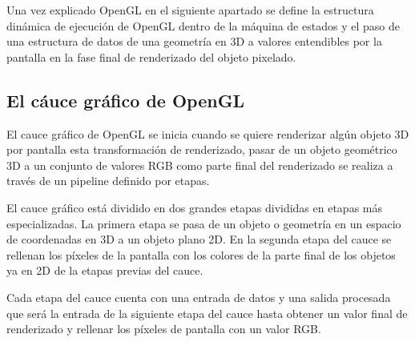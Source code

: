 \documentclass[a4paper, 17pt]{book}
\begin{document}
Una vez explicado OpenGL en el siguiente apartado se define la estructura dinámica de ejecución de OpenGL dentro de la máquina
de estados y el paso de una estructura de datos de una geometría en 3D a valores entendibles por la pantalla en la fase final
de renderizado del objeto pixelado.

\subsection{El cáuce gráfico de OpenGL} 
\label{subsec:CauceOpenGL}

El cauce gráfico de OpenGL se inicia cuando se quiere renderizar algún objeto 3D por pantalla esta transformación de renderizado,
pasar de un objeto geométrico 3D a un conjunto de valores RGB como parte final del renderizado se realiza a través de un pipeline
definido por etapas.

\vspace{1mm} %

El cauce gráfico está dividido en dos grandes etapas divididas en etapas más especializadas. La primera etapa se pasa de un objeto
o geometría en un espacio de coordenadas en 3D a un objeto plano 2D. En la segunda etapa del cauce se rellenan los píxeles de la
pantalla con los colores de la parte final de los objetos ya en 2D de la etapas previas del cauce.

\vspace{1mm} %

Cada etapa del cauce cuenta con una entrada de datos y una salida procesada que será la entrada de la siguiente etapa del cauce
hasta obtener un valor final de renderizado y rellenar los píxeles de pantalla con un valor RGB.
\end{document}
